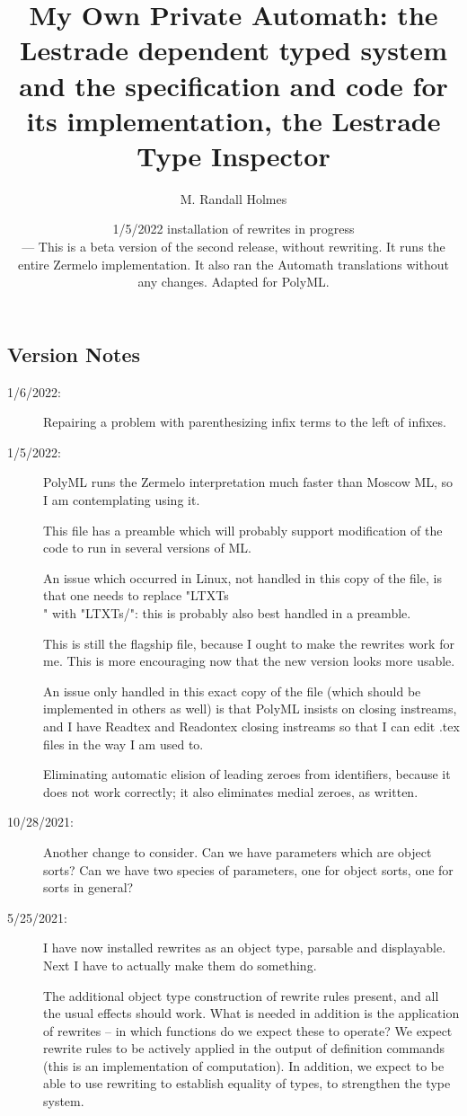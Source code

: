 \documentclass[12pt]{article}
\title{My Own Private Automath:  the Lestrade dependent typed system and the specification and code for its implementation, the Lestrade Type Inspector}
\author{M. Randall Holmes}
\date{1/5/2022  installation of rewrites in progress \\
--- This is a beta version of the second release, without rewriting.  It runs the entire  Zermelo implementation. It also ran the Automath translations without any changes.  Adapted for PolyML.}
\begin{document}
\maketitle

\tableofcontents

\newpage

\subsection{Version Notes}

\begin{description}

\item[1/6/2022:]  Repairing a problem with parenthesizing infix terms to the left of infixes.

\item[1/5/2022:]  PolyML runs the Zermelo interpretation much faster than Moscow ML, so I am contemplating using it.

This file has a preamble which will probably support modification of the code to run in several versions of ML.

An issue which occurred in Linux, not handled in this copy of the file, is that one needs to replace "LTXTs\\" with
"LTXTs/":  this is probably also best handled in a preamble.

This is still the flagship file, because I ought to make the rewrites work for me.  This is more encouraging now that
the new version looks more usable.

An issue only handled in this exact copy of the file (which should be implemented in others as well) is that
PolyML insists on closing instreams, and I have Readtex and Readontex closing instreams so that I can edit .tex
files in the way I am used to.

Eliminating automatic elision of leading zeroes from identifiers, because it does not work correctly;
it also eliminates medial zeroes, as written.

\item[10/28/2021:]  Another change to consider.  Can we have parameters which are object sorts?  Can we have
two species of parameters, one for object sorts, one for sorts in general?

\item[5/25/2021:]  I have now installed rewrites as an object type, parsable and displayable.  Next I have to actually make them do something.

The additional object type construction of rewrite rules present, and all the usual effects should work.  What is needed in addition is the application of rewrites -- in which functions
do we expect these to operate?  We expect rewrite rules to be actively applied in the output of definition commands (this is an implementation of computation).
In addition, we expect to be able to use rewriting to establish equality of types, to strengthen the type system.


\end{description}
\end{document}
